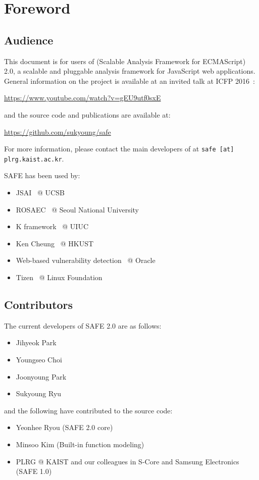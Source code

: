 \chapter{Foreword}
\label{c:1:foreword}

\section{Audience}
This document is for users of \safe (Scalable Analysis Framework for ECMAScript)
2.0, a scalable and pluggable analysis framework for JavaScript web applications.
General information on the \safe project is available at an invited talk at ICFP 2016~\cite{safeicfp16}:
\begin{center}
  \url{https://www.youtube.com/watch?v=gEU9utf0sxE}
\end{center}
and the source code and publications are available at:
\begin{center}
  \url{https://github.com/sukyoung/safe}
\end{center}
For more information, please contact the main developers of \safe
at \texttt{safe [at] plrg.kaist.ac.kr}.

SAFE has been used by:
\begin{itemize}
\itemsep-.1em
\item JSAI~\cite{jsai} @ UCSB
\item ROSAEC~\cite{rosaec} @ Seoul National University
\item K framework~\cite{kjs} @ UIUC
\item Ken Cheung~\cite{emse16} @ HKUST
\item Web-based vulnerability detection~\cite{oracle} @ Oracle
\item Tizen~\cite{tizen} @ Linux Foundation
\end{itemize}

\section{Contributors}
The current developers of SAFE 2.0 are as follows:
\begin{itemize}
\itemsep-.1em
\item Jihyeok Park
\item Youngseo Choi
\item Joonyoung Park
\item Sukyoung Ryu
\end{itemize}
and the following have contributed to the source code:
\begin{itemize}
\itemsep-.1em
\item Yeonhee Ryou (SAFE 2.0 core)
\item Minsoo Kim (Built-in function modeling)
\item PLRG @ KAIST and our colleagues in S-Core and Samsung Electronics (SAFE 1.0)
\end{itemize}


